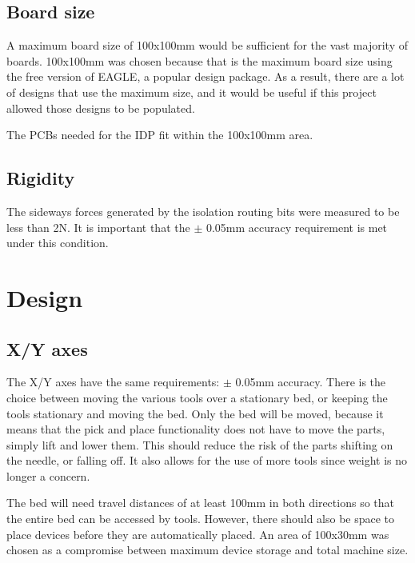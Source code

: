 \subsection{Board size}
A maximum board size of 100x100mm would be sufficient for the vast majority of boards. 100x100mm was chosen because that
is the maximum board size using the free version of EAGLE, a popular design package. As a result, there are a lot of designs
that use the maximum size, and it would be useful if this project allowed those designs to be populated.

The PCBs needed for the IDP fit within the 100x100mm area.

\subsection{Rigidity}
The sideways forces generated by the isolation routing bits were measured to be less than 2N. It is important that the $\pm$ 0.05mm
accuracy requirement is met under this condition.

\section{Design}

\subsection{X/Y axes}

The X/Y axes have the same requirements: $\pm$ 0.05mm accuracy. There is the choice between moving the various tools over a stationary
bed, or keeping the tools stationary and moving the bed. Only the bed will be moved, because it means that the pick
and place functionality does not have to move the parts, simply lift and lower them. This should reduce the risk of the parts
shifting on the needle, or falling off. It also allows for the use of more tools since weight is no longer a concern.

The bed will need travel distances of at least 100mm in both directions so that the entire bed can be accessed by tools. However,
there should also be space to place devices before they are automatically placed. An area of 100x30mm was chosen as a compromise
between maximum device storage and total machine size.

